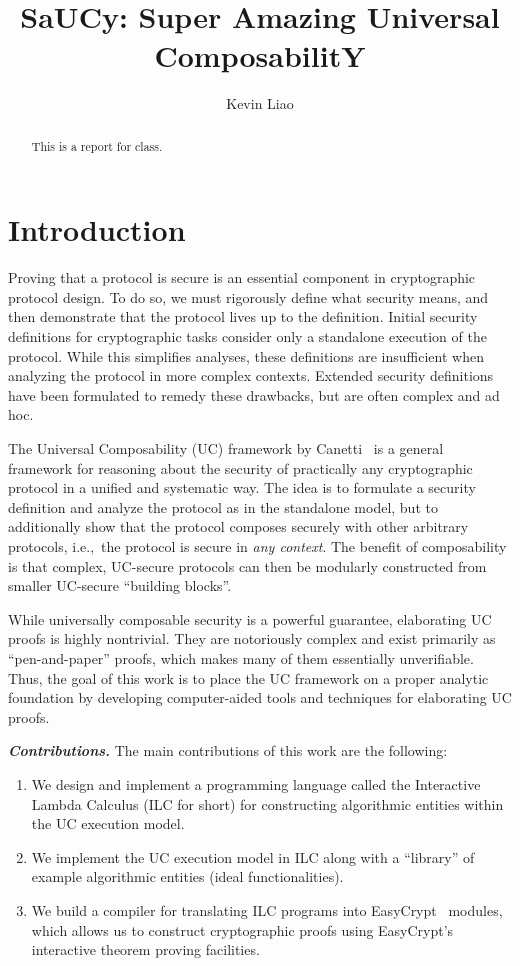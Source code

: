 \documentclass{llncs}
\title{SaUCy: Super Amazing Universal ComposabilitY}
\author{Kevin Liao}
\institute{}
\newcommand{\parheader}[1]{\noindent\emph{\textbf{{#1}.}}}
\begin{document}
\maketitle

\begin{abstract}
This is a report for class.
\end{abstract}

\section{Introduction}

Proving that a protocol is secure is an essential component in cryptographic
protocol design. To do so, we must rigorously define what security means, and
then demonstrate that the protocol lives up to the definition. Initial security
definitions for cryptographic tasks consider only a standalone execution of the
protocol. While this simplifies analyses, these definitions are insufficient
when analyzing the protocol in more complex contexts. Extended security
definitions have been formulated to remedy these drawbacks, but are often
complex and ad hoc.

The Universal Composability (UC) framework by
Canetti~\cite{canetti2001universally} is a general framework for reasoning about
the security of practically any cryptographic protocol in a unified and
systematic way. The idea is to formulate a security definition and analyze the
protocol as in the standalone model, but to additionally show that the protocol
composes securely with other arbitrary protocols, i.e.,\ the protocol is secure
in \emph{any context}. The benefit of composability is that complex, UC-secure
protocols can then be modularly constructed from smaller UC-secure ``building
blocks''.

While universally composable security is a powerful guarantee, elaborating UC
proofs is highly nontrivial. They are notoriously complex and exist primarily as
``pen-and-paper'' proofs, which makes many of them essentially
unverifiable. Thus, the goal of this work is to place the UC framework on a
proper analytic foundation by developing computer-aided tools and techniques for
elaborating UC proofs.\smallskip

\parheader{Contributions} The main contributions of this work are the
following:
\begin{enumerate}
\item We design and implement a programming language called the Interactive
Lambda Calculus (ILC for short) for constructing algorithmic entities within the
UC execution model.
\item We implement the UC execution model in ILC along with a ``library'' of
example algorithmic entities (ideal functionalities).
\item We build a compiler for translating ILC programs into
EasyCrypt~\cite{barthe2011computer} modules, which allows us to construct
cryptographic proofs using EasyCrypt's interactive theorem proving facilities.
\end{enumerate}
\end{document}
